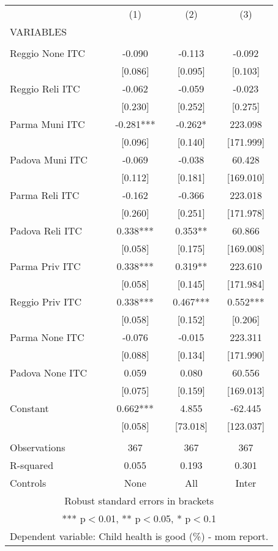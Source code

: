 \begin{tabular}{lccc} \hline
 & (1) & (2) & (3) \\
VARIABLES &  &  &  \\ \hline
 &  &  &  \\
Reggio None ITC & -0.090 & -0.113 & -0.092 \\
 & [0.086] & [0.095] & [0.103] \\
Reggio Reli ITC & -0.062 & -0.059 & -0.023 \\
 & [0.230] & [0.252] & [0.275] \\
Parma Muni ITC & -0.281*** & -0.262* & 223.098 \\
 & [0.096] & [0.140] & [171.999] \\
Padova Muni ITC & -0.069 & -0.038 & 60.428 \\
 & [0.112] & [0.181] & [169.010] \\
Parma Reli ITC & -0.162 & -0.366 & 223.018 \\
 & [0.260] & [0.251] & [171.978] \\
Padova Reli ITC & 0.338*** & 0.353** & 60.866 \\
 & [0.058] & [0.175] & [169.008] \\
Parma Priv ITC & 0.338*** & 0.319** & 223.610 \\
 & [0.058] & [0.145] & [171.984] \\
Reggio Priv ITC & 0.338*** & 0.467*** & 0.552*** \\
 & [0.058] & [0.152] & [0.206] \\
Parma None ITC & -0.076 & -0.015 & 223.311 \\
 & [0.088] & [0.134] & [171.990] \\
Padova None ITC & 0.059 & 0.080 & 60.556 \\
 & [0.075] & [0.159] & [169.013] \\
Constant & 0.662*** & 4.855 & -62.445 \\
 & [0.058] & [73.018] & [123.037] \\
 &  &  &  \\
Observations & 367 & 367 & 367 \\
R-squared & 0.055 & 0.193 & 0.301 \\
 Controls & None & All & Inter \\ \hline
\multicolumn{4}{c}{ Robust standard errors in brackets} \\
\multicolumn{4}{c}{ *** p$<$0.01, ** p$<$0.05, * p$<$0.1} \\
\multicolumn{4}{c}{ Dependent variable: Child health is good (\%) - mom report.} \\
\end{tabular}
